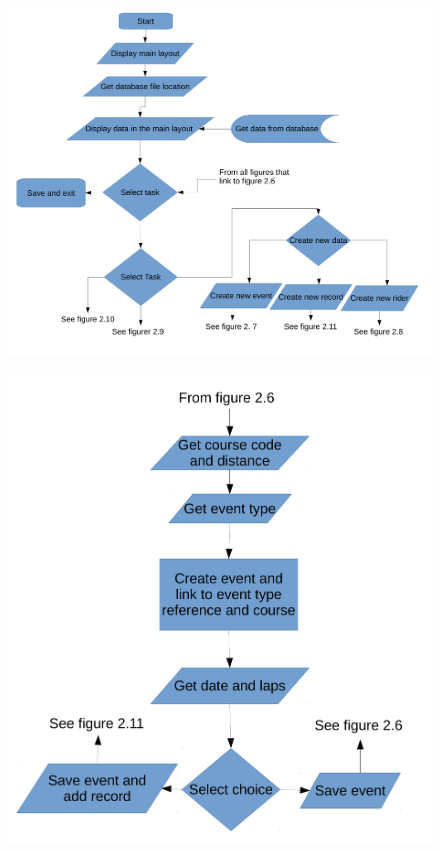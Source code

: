 \begin{figure}[H]
	\includegraphics[width=\textwidth]{./FlowChart/SectionOne.pdf}
	\caption{} \label{fig:} 	
\end{figure}

\begin{figure}[H]
	\includegraphics[width=\textwidth]{./FlowChart/SectionTwo.pdf}
	\caption{} \label{fig:} 	
\end{figure}

